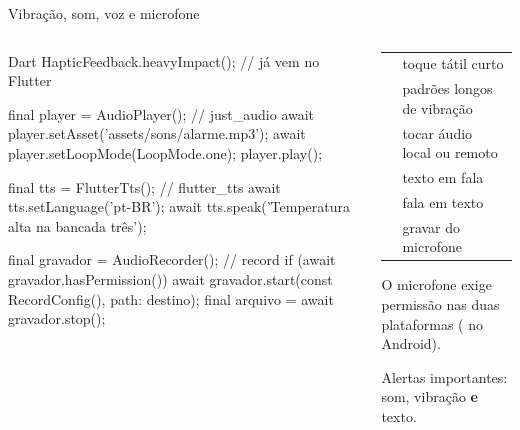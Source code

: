 \documentclass[aspectratio=169,10pt]{beamer}
\begin{document}
\begin{frame}[fragile]{Vibração, som, voz e microfone}
  \begin{columns}[T]
    \begin{column}{0.56\textwidth}
\begin{codigo}[title=Alarme de temperatura]{Dart}
HapticFeedback.heavyImpact();        // já vem no Flutter

final player = AudioPlayer();        // just_audio
await player.setAsset('assets/sons/alarme.mp3');
await player.setLoopMode(LoopMode.one);
player.play();

final tts = FlutterTts();            // flutter_tts
await tts.setLanguage('pt-BR');
await tts.speak('Temperatura alta na bancada três');

final gravador = AudioRecorder();    // record
if (await gravador.hasPermission()) {
  await gravador.start(const RecordConfig(), path: destino);
}
final arquivo = await gravador.stop();
\end{codigo}
    \end{column}
    \begin{column}{0.42\textwidth}
      \scriptsize
      \begin{tabularx}{\linewidth}{@{}l L@{}}
        \toprule
         &  \\
        \midrule
         & toque tátil curto \\
         & padrões longos de vibração \\
         & tocar áudio local ou remoto \\
         & texto em fala \\
         & fala em texto \\
         & gravar do microfone \\
        \bottomrule
      \end{tabularx}
      \begin{atencao}
        O microfone exige permissão nas duas plataformas ( no Android).
      \end{atencao}
      \begin{dica}
        Alertas importantes: som, vibração \textbf{e} texto.
      \end{dica}
    \end{column}
  \end{columns}
\end{frame}
\end{document}
